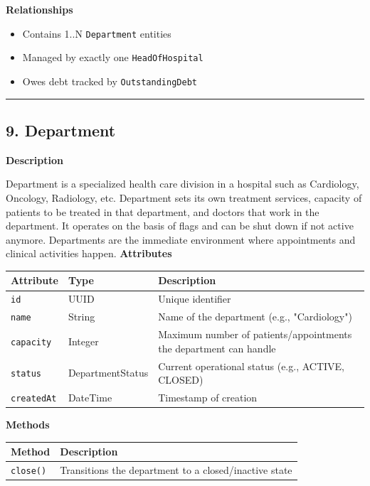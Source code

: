 \documentclass[12pt, a4paper]{article}
\begin{document}
\textbf{Relationships}

\begin{itemize}
    \item Contains 1..N \texttt{Department} entities
    \item Managed by exactly one \texttt{HeadOfHospital}
    \item Owes debt tracked by \texttt{OutstandingDebt}
\end{itemize}

\par\medskip\hrule\medskip

\subsection{9. Department}\label{sec:9-department}

\textbf{Description}

Department is a specialized health care division in a hospital such as Cardiology, Oncology, Radiology, etc. Department sets its own treatment services, capacity of patients to be treated in that department, and doctors that work in the department. It operates on the basis of flags and can be shut down if not active anymore. Departments are the immediate environment where appointments and clinical activities happen.
\textbf{Attributes}

\begin{center}
\small
\renewcommand{\arraystretch}{1.35}
\begin{tabularx}{\textwidth}{|>{\raggedright\arraybackslash}p{3.4cm}|>{\raggedright\arraybackslash}p{3.3cm}|Y|}
\hline
{}
\textbf{Attribute} & \textbf{Type} & \textbf{Description} \\ \hline
\texttt{id} & UUID & Unique identifier \\ \hline
\texttt{name} & String & Name of the department (e.g., "Cardiology") \\ \hline
\texttt{capacity} & Integer & Maximum number of patients/appointments the department can handle \\ \hline
\texttt{status} & DepartmentStatus & Current operational status (e.g., ACTIVE, CLOSED) \\ \hline
\texttt{createdAt} & DateTime & Timestamp of creation \\ \hline
\end{tabularx}
\end{center}

\textbf{Methods}

\begin{center}
\small
\renewcommand{\arraystretch}{1.35}
\begin{tabularx}{\textwidth}{|M|Y|}
\hline
{}
\textbf{Method} & \textbf{Description} \\ \hline
\texttt{close()} & Transitions the department to a closed/inactive state \\ \hline
\end{tabularx}
\end{center}
\end{document}
